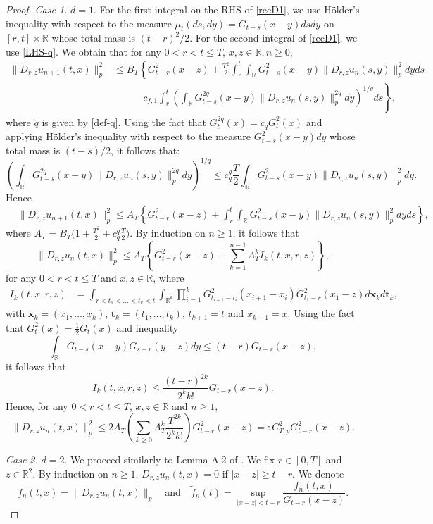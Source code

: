 \documentclass[12pt]{article}
\def\bR{\mathbb{R}}
\begin{document}
\begin{proof}
{\em Case 1.} $d=1$.
For the first integral on the RHS of \eqref{recD1}, we use H\"older's inequality with respect to the measure $\mu_t(ds,dy)=G_{t-s}(x-y)dsdy$ on $[r,t] \times \bR$ whose total mass is $(t-r)^2/2$. For the second integral of \eqref{recD1}, we use \eqref{LHS-q}. We obtain that for any $0<r<t\leq T$, $x,z \in \bR, n\geq 0$,
\begin{align*}
\|D_{r,z}u_{n+1}(t,x)\|_p^2  & \leq  B_{T} \left\{ G_{t-r}^2(x-z)+ \frac{T^2}{2}\int_r^t \int_{\bR} G_{t-s}^2(x-y) \|D_{r,z}u_n(s,y)\|_p^2 dyds \right.\\
& \quad \quad \quad \left. c_{f,1}\int_r^t \left( \int_{\bR}G_{t-s}^{2q}(x-y) \|D_{r,z}u_n(s,y)\|_p^{2q}dy\right)^{1/q}ds \right\},
\end{align*}
where $q$ is given by \eqref{def-q}. Using the fact that $G_t^{2q}(x)=c_{q} G_t^{2}(x)$ and applying H\"older's inequality with respect to the measure $G_{t-s}^2(x-y)dy$ whose total mass is $(t-s)/2$, it follows that:
\[
\left(\int_{\bR} G_{t-s}^{2q}(x-y) \|D_{r,z}u_n(s,y)\|_p^{2q} dy\right)^{1/q} \leq c_{q}^{q} \frac{T}{2}\int_{\bR} G_{t-s}^2(x-y)\|D_{r,z}u_n(s,y)\|_p^{2} dy.
\]
Hence
\begin{align*}
&\|D_{r,z}u_{n+1}(t,x)\|_p^2  \leq  A_T \left\{ G_{t-r}^2(x-z)+ \int_r^t \int_{\bR} G_{t-s}^2(x-y) \|D_{r,z}u_n(s,y)\|_p^2 dyds \right\},
\end{align*}
where $A_T=B_{T} \big(1+\frac{T^2}{2}+c_{q}^{q} \frac{T}{2}\big)$.
By induction on $n\geq 1$, it follows that 
\[
\|D_{r,z}u_{n}(t,x)\|_p^2 \leq A_T \left\{ G_{t-r}^2(x-z)+ \sum_{k=1}^{n-1} A_T^k I_k(t,x,r,z)\right\},
\]
for any $0<r<t\leq T$ and $x,z \in \bR$, where
\begin{align}
\label{def-Ik}
I_k(t,x,r,z)&=\int_{r<t_1<\ldots<t_k<t} \int_{\bR^k}\prod_{i=1}^{k}G_{t_{i+1}-t_i}^2(x_{i+1}-x_i) G_{t_1-r}^2(x_1-z)d\pmb{x}_k d \pmb{t}_k,
\end{align}
with $\pmb{x}_k=(x_1,\ldots,x_k)$, $\pmb{t}_k=(t_1,\ldots,t_k)$, $t_{k+1}=t$ and $x_{k+1}=x$. Using the fact that $G_t^2(x)=\frac{1}{2}G_t(x)$ and inequality
\[
\int_{\bR}G_{t-s}(x-y)G_{s-r}(y-z)dy \leq (t-r)G_{t-r}(x-z),
\]
it follows that 
\[
I_k(t,x,r,z)\leq \frac{(t-r)^{2k}}{2^k k!}G_{t-r}(x-z).
\]
Hence, for any $0<r<t\leq T$, $x,z \in \bR$ and $n\geq 1$,
\[
\|D_{r,z}u_{n}(t,x)\|_p^2 \leq 2A_T \left(\sum_{k\geq 0} A_T^k \frac{T^{2k}}{2^k k!} \right) G_{t-r}^2(x-z)=:C_{T,p}^2 G_{t-r}^2(x-z).
\]

\medskip

{\em Case 2.} $d=2$. We proceed similarly to Lemma A.2 of \cite{BS26}. We fix $r \in [0,T]$ and $z \in \bR^2$.
By induction on $n \geq 1$,  $D_{r,z}u_n(t,x)=0$ if $|x-z|\geq t-r$. We denote 
\[
f_n(t,x)=\|D_{r,z}u_n(t,x)\|_p \quad \mbox{and} \quad \widetilde{f}_n(t)=\sup_{|x-z|<t-r}\frac{f_n(t,x)}{G_{t-r}(x-z)}.
\]


\end{proof}
\end{document}

